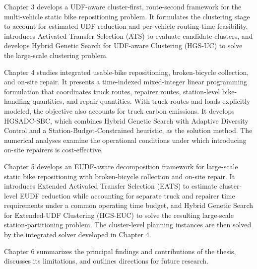 Chapter 3 develops a UDF-aware cluster-first, route-second framework for the multi-vehicle static bike repositioning problem. It formulates the clustering stage to account for estimated UDF reduction and per-vehicle routing-time feasibility, introduces Activated Transfer Selection (ATS) to evaluate candidate clusters, and develops Hybrid Genetic Search for UDF-aware Clustering (HGS-UC) to solve the large-scale clustering problem.

Chapter 4 studies integrated usable-bike repositioning, broken-bicycle collection, and on-site repair. It presents a time-in\-dexed mixed-integer linear programming formulation that coordinates truck routes, repairer routes, station-level bike-handling quantities, and repair quantities. With truck routes and loads explicitly modeled, the objective also accounts for truck carbon emissions. It develops HGSADC-SBC, which combines Hybrid Genetic Search with Adaptive Diversity Control and a Sta\-tion-Budget-Constrained heuristic, as the solution method. The numerical analyses examine the operational conditions under which introducing on-site repairers is cost-effective.

Chapter 5 develops an EUDF-aware decomposition framework for large-scale static bike repositioning with broken-bicycle collection and on-site repair. It introduces Extended Activated Transfer Selection (EATS) to estimate cluster-level EUDF reduction while accounting for separate truck and repairer time requirements under a common operating time budget, and Hybrid Genetic Search for Extended-UDF Clustering (HGS-EUC) to solve the resulting large-scale station-partitioning problem. The cluster-level planning instances are then solved by the integrated solver developed in Chapter 4.

Chapter 6 summarizes the principal findings and contributions of the thesis, discusses its limitations, and outlines directions for future research.
